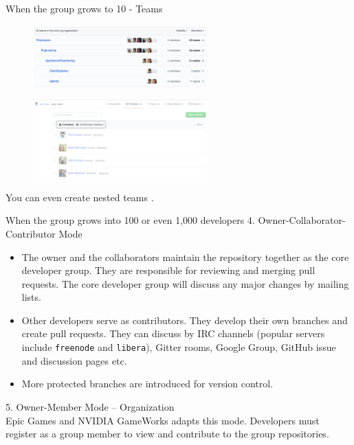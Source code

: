 \documentclass[12pt]{beamer}
\begin{document}
\begin{frame}{When the group grows to 10 - Teams}
    \begin{figure}[H]
        \centering
        \includegraphics[width=0.6\textwidth]{nested-teams-eng-example.png}
    \end{figure}
    \begin{figure}[H]
        \centering
        \includegraphics[width=0.6\textwidth]{team-and-subteam-members.png}
    \end{figure}
    You can even create nested teams \cite{githubdoc}.
\end{frame}

\begin{frame}{When the group grows into 100 or even 1,000 developers}
    4. Owner-Collaborator-Contributor Mode
    \begin{itemize}
        \item The owner and the collaborators maintain the repository together as the core developer group. They are responsible for reviewing and merging pull requests. The core developer group will discuss any major changes by mailing lists.
        \item Other developers serve as contributors. They develop their own branches and create pull requests. They can discuss by IRC channels (popular servers include \texttt{freenode} and \texttt{libera}), Gitter rooms, Google Group, GitHub issue and discussion pages etc.
        \item More protected branches are introduced for version control.
    \end{itemize}
    5. Owner-Member Mode -- Organization\\
    Epic Games and NVIDIA GameWorks adapts this mode. Developers must register as a group member to view and contribute to the group repositories.
\end{frame}
\end{document}
